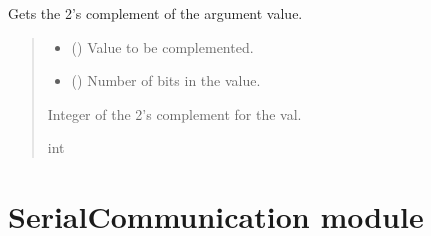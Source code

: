 \documentclass[letterpaper,10pt,english]{sphinxmanual}
\begin{document}
\begin{fulllineitems}
\begin{fulllineitems}
\label{\detokenize{PodPacketHandling:PodPacketHandling.POD_Packets.TwosComplement}}
\pysigstartsignatures
{}
\pysigstopsignatures
\sphinxAtStartPar
Gets the 2’s complement of the argument value.
\begin{quote}\begin{description}
\begin{itemize}
\item {} 
\sphinxAtStartPar
{} () \textendash{} Value to be complemented.

\item {} 
\sphinxAtStartPar
{} () \textendash{} Number of bits in the value.

\end{itemize}

\sphinxAtStartPar
Integer of the 2’s complement for the val.

\sphinxAtStartPar
int

\end{description}\end{quote}

\end{fulllineitems}


\end{fulllineitems}


\sphinxstepscope


\section{SerialCommunication module}
\label{\detokenize{SerialCommunication:module-SerialCommunication}}\label{\detokenize{SerialCommunication:serialcommunication-module}}\label{\detokenize{SerialCommunication::doc}}
\end{document}
